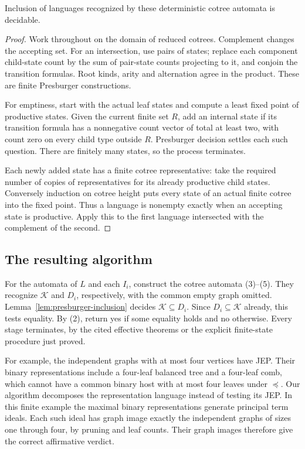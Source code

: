\begin{lemma}\label{lem:presburger-inclusion}
Inclusion of languages recognized by these deterministic cotree
automata is decidable.
\end{lemma}
\begin{proof}
Work throughout on the domain of reduced cotrees. Complement changes
the accepting set. For an intersection, use pairs of states; replace
each component child-state count by the sum of pair-state counts
projecting to it, and conjoin the transition formulas. Root kinds,
arity and alternation agree in the product. These are finite
Presburger constructions.

For emptiness, start with the actual leaf states and compute a least
fixed point of productive states. Given the current finite set $R$,
add an internal state if its transition formula has a nonnegative
count vector of total at least two, with count zero on every child
type outside $R$. Presburger decision settles each such question.
There are finitely many states, so the process terminates.

Each newly added state has a finite cotree representative: take the
required number of copies of representatives for its already productive
child states. Conversely induction on cotree height puts every state
of an actual finite cotree into the fixed point. Thus a language is
nonempty exactly when an accepting state is productive. Apply this to
the first language intersected with the complement of the second.
\end{proof}

\subsection{The resulting algorithm}
For the automata of $L$ and each $I_i$, construct the cotree automata
(3)--(5). They recognize $\mathcal K$ and $D_i$, respectively, with
the common empty graph omitted. Lemma~\ref{lem:presburger-inclusion}
decides $\mathcal K\subseteq D_i$. Since $D_i\subseteq\mathcal K$
already, this tests equality. By (2), return yes if some equality
holds and no otherwise. Every stage terminates, by the cited effective
theorems or the explicit finite-state procedure just proved.

For example, the independent graphs with at most four vertices have
JEP. Their binary representations include a four-leaf balanced tree and
a four-leaf comb, which cannot have a common binary host with at most
four leaves under $\preceq$. Our algorithm decomposes the representation
language instead of testing its JEP. In this finite example the maximal
binary representations generate principal term ideals. Each such ideal
has graph image exactly the independent graphs of sizes one through
four, by pruning and leaf counts. Their graph images therefore give
the correct affirmative verdict.


